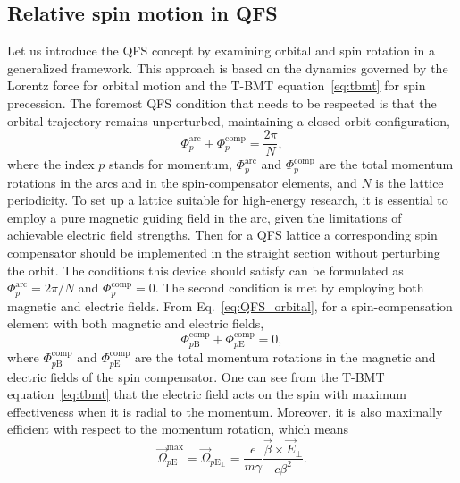 \documentclass[%
  aps,
  pra,
  preprint,
  a4paper,
  amsmath,
  amssymb,
  floatfix,
  longbibliography,
  superscriptaddress
]{revtex4-2}
\begin{document}
\subsection{Relative spin motion in QFS}

Let us introduce the QFS concept by examining orbital and spin rotation in a
generalized framework. This approach is based on the dynamics governed by the
Lorentz force for orbital motion and the T-BMT equation~\eqref{eq:tbmt} for
spin precession. The foremost QFS condition that needs to be respected is that
the orbital trajectory remains unperturbed, maintaining a closed orbit
configuration,
\begin{equation}
  \Phi_p^{\mathrm{arc}}+\Phi_{p}^{\mathrm{comp}}=\frac{2\pi}{N},
  \label{eq:QFS_orbital}
\end{equation}
where the index $p$ stands for momentum, $\Phi_p^{\mathrm{arc}}$ and
$\Phi_{p}^{\mathrm{comp}}$ are the total momentum rotations in the arcs and in
the spin-compensator elements, and $N$ is the lattice periodicity. To set up a
lattice suitable for high-energy research, it is essential to employ a pure
magnetic guiding field in the arc, given the limitations of achievable electric
field strengths. Then for a QFS lattice a corresponding spin compensator should
be implemented in the straight section without perturbing the orbit. The
conditions this device should satisfy can be formulated as
$\Phi_p^{\mathrm{arc}} = 2\pi/N$ and $\Phi_{p}^{\mathrm{comp}} = 0$. The second
condition is met by employing both magnetic and electric fields. From
Eq.~\eqref{eq:QFS_orbital}, for a spin-compensation element with both magnetic
and electric fields,
\begin{equation}
  \Phi_{p\mathrm{B}}^{\mathrm{comp}}+\Phi_{p\mathrm{E}}^{\mathrm{comp}} = 0,
\end{equation}
where $\Phi_{p\mathrm{B}}^{\mathrm{comp}}$ and
$\Phi_{p\mathrm{E}}^{\mathrm{comp}}$ are the total momentum rotations in the
magnetic and electric fields of the spin compensator. One can see from the
T-BMT equation~\eqref{eq:tbmt} that the electric field acts on the spin with
maximum effectiveness when it is radial to the momentum. Moreover, it is also
maximally efficient with respect to the momentum rotation, which means
\begin{equation}
  \vec{\Omega}_{p\mathrm{E}}^{\mathrm{max}} = \vec{\Omega}_{p\mathrm{E}_{\perp}}
  =\frac{e}{m \gamma} \frac{\vec{\beta} \times \vec{E}_{\perp}}{c \beta^2}.
\end{equation}
\end{document}
